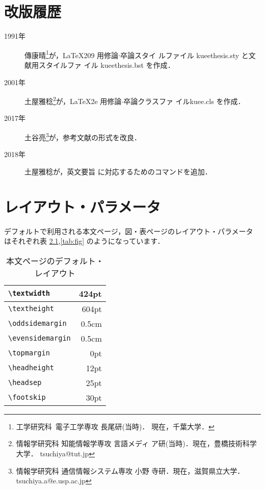 \documentclass[
  sotsuron]{kuee}
\begin{document}
\chapter{改版履歴}\label{chap:history}
\begin{description}
  \item[1991年] 傳康晴\footnote{工学研究科\ 電子工学専攻 長尾研(当時)．
          現在，千葉大学．}が，\LaTeX{}209 用修論$\cdot$卒論スタイ
        ルファイル {\ttfamily kueethesis.sty} と文献用スタイルファ
        イル {\ttfamily kueethesis.bst} を作成\cite{OldTebiki}．
  \item[2001年] 土屋雅稔\footnote{情報学研究科 知能情報学専攻 言語メディ
        ア研(当時)．現在，豊橋技術科学大学．{\ttfamily
        tsuchiya@tut.jp}}が，\LaTeX2e{} 用修論$\cdot$卒論クラスファ
        イル{\ttfamily kuee.cls} を作成\cite{Tebiki2004}．
        \setcounter{tsuaffil}{\value{footnote}}
  \item[2017年] 土谷亮\footnote{情報学研究科 通信情報システム専攻 小野
        寺研．現在，滋賀県立大学．{\ttfamily
        tsuchiya.a@e.usp.ac.jp}}が，参考文献の形式を改良．
  \item[2018年] 土屋雅稔\footnotemark[\value{tsuaffil}]{}が，英文要旨
        に対応するためのコマンドを追加．
\end{description}

\chapter{レイアウト・パラメータ}\label{chap:layout}

デフォルトで利用される本文ページ，図・表ページのレイアウト・パラメータ
はそれぞれ表 \ref{tab:text},\ref{tab:fig} のようになっています．

\begin{table}
  \caption{本文ページのデフォルト・レイアウト}\label{tab:text}
  \begin{center}
    \begin{tabular}{|l|r|}
      \hline
      \verb+\textwidth+ & 424pt \\ \hline
      \verb+\textheight+ & 604pt \\ \hline
      \verb+\oddsidemargin+ & 0.5cm \\ \hline
      \verb+\evensidemargin+ & 0.5cm \\ \hline
      \verb+\topmargin+ & 0pt   \\ \hline
      \verb+\headheight+ & 12pt  \\ \hline
      \verb+\headsep+ & 25pt  \\ \hline
      \verb+\footskip+ & 30pt  \\ \hline
    \end{tabular}
  \end{center}
\end{table}
\end{document}

